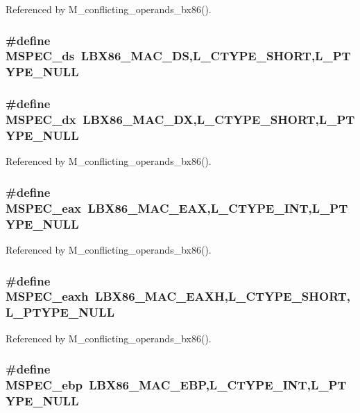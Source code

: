Referenced by M\_\-conflicting\_\-operands\_\-bx86().
\subsubsection{\setlength{\rightskip}{0pt plus 5cm}\#define MSPEC\_\-ds~LBX86\_\-MAC\_\-DS,L\_\-CTYPE\_\-SHORT,L\_\-PTYPE\_\-NULL}\label{ml__bx86_8c_13cbfda7951adb67d3fb6d73cd7109c8}


\subsubsection{\setlength{\rightskip}{0pt plus 5cm}\#define MSPEC\_\-dx~LBX86\_\-MAC\_\-DX,L\_\-CTYPE\_\-SHORT,L\_\-PTYPE\_\-NULL}\label{ml__bx86_8c_2d9881ed298e27b8cbdb7871ee3c6551}




Referenced by M\_\-conflicting\_\-operands\_\-bx86().
\subsubsection{\setlength{\rightskip}{0pt plus 5cm}\#define MSPEC\_\-eax~LBX86\_\-MAC\_\-EAX,L\_\-CTYPE\_\-INT,L\_\-PTYPE\_\-NULL}\label{ml__bx86_8c_dbb8d478157797b8c5c2de9bf3c13f71}




Referenced by M\_\-conflicting\_\-operands\_\-bx86().
\subsubsection{\setlength{\rightskip}{0pt plus 5cm}\#define MSPEC\_\-eaxh~LBX86\_\-MAC\_\-EAXH,L\_\-CTYPE\_\-SHORT,L\_\-PTYPE\_\-NULL}\label{ml__bx86_8c_d115c541c3ac1afc9e6ca3a6702d965c}




Referenced by M\_\-conflicting\_\-operands\_\-bx86().
\subsubsection{\setlength{\rightskip}{0pt plus 5cm}\#define MSPEC\_\-ebp~LBX86\_\-MAC\_\-EBP,L\_\-CTYPE\_\-INT,L\_\-PTYPE\_\-NULL}\label{ml__bx86_8c_613d10d5e1da616c02c1476d3ff03ad8}




